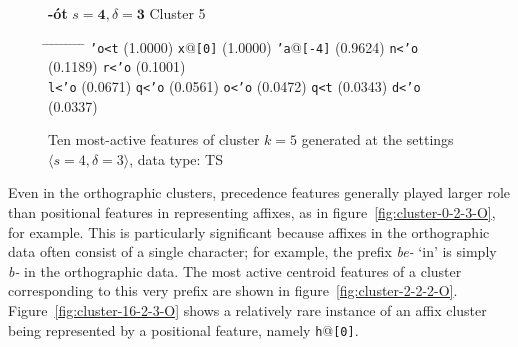 \begin{figure}[ht] 
\begin{mdframed}
{\LARGE \textbf{-\'ot}} \hfill {\large$s=\textbf{4}, \delta=\textbf{3}$} \hfill Cluster 5\\
\vspace{-10pt}
\begin{normalsize}
\begin{tabbing}
\hspace{6ex} \= \hspace{9.5ex} \= \hspace{7ex} \= \hspace{10ex} \= \hspace{7ex} \= \hspace{10ex} \= \hspace{5ex} \= \hspace{9.5ex} \= \hspace{5ex} \= \hspace{8ex} \kill
\texttt{\a'{o}<t} \> (1.0000) \> \texttt{x}@\texttt{[0]} \> (1.0000) \> \texttt{\a'{a}}@\texttt{[-4]} \> (0.9624) \> \texttt{n<\a'{o}} \> (0.1189) \> \texttt{r<\a'{o}} \> (0.1001) \\
 \texttt{l<\a'{o}} \> (0.0671) \> \texttt{q<\a'{o}} \> (0.0561) \> \texttt{o<\a'{o}} \> (0.0472) \> \texttt{q<t} \> (0.0343) \> \texttt{d<\a'{o}} \> (0.0337)
 \end{tabbing}
 \end{normalsize}
\label{fig:cluster-5-4-3-TS}
\caption{Ten most-active features of cluster $k = 5$ generated at the settings $\langle{s}=4,\delta=3\rangle$, data type: TS}
\end{mdframed}
\end{figure}
Even in the orthographic clusters, precedence features generally played larger role than positional features in representing affixes, 
as in figure~\ref{fig:cluster-0-2-3-O}, for example. 
This is particularly significant because affixes in the orthographic data often consist of a single character; for example, the prefix \textit{be-} `in' is simply \textit{b-} in the orthographic data. The most active centroid features of a cluster corresponding to this very prefix are shown in figure~\ref{fig:cluster-2-2-2-O}. Figure~\ref{fig:cluster-16-2-3-O} shows a relatively rare instance of an affix cluster being represented by a positional feature, namely  \texttt{h}@\texttt{[0]}.
